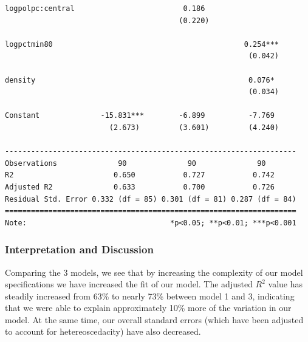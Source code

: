 \documentclass[]{article}
\begin{document}
\begin{verbatim}
logpolpc:central                         0.186                     
                                        (0.220)                    
                                                                   
logpctmin80                                            0.254***    
                                                        (0.042)    
                                                                   
density                                                 0.076*     
                                                        (0.034)    
                                                                   
Constant              -15.831***        -6.899          -7.769     
                        (2.673)         (3.601)         (4.240)    
                                                                   
-------------------------------------------------------------------
Observations              90              90              90       
R2                       0.650           0.727           0.742     
Adjusted R2              0.633           0.700           0.726     
Residual Std. Error 0.332 (df = 85) 0.301 (df = 81) 0.287 (df = 84)
===================================================================
Note:                                 *p<0.05; **p<0.01; ***p<0.001
\end{verbatim}

\hypertarget{interpretation-and-discussion}{%
\subsubsection{Interpretation and
Discussion}\label{interpretation-and-discussion}}

Comparing the 3 models, we see that by increasing the complexity of our
model specifications we have increased the fit of our model. The
adjusted \(R^2\) value has steadily increased from 63\% to nearly 73\%
between model 1 and 3, indicating that we were able to explain
approximately 10\% more of the variation in our model. At the same time,
our overall standard errors (which have been adjusted to account for
hetereoscedacity) have also decreased.
\end{document}
